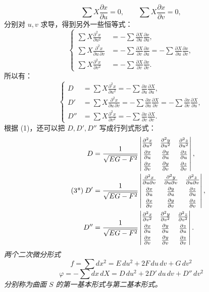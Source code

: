 \[
 \sum X\frac{\partial x}{\partial u}=0,\qquad
 \sum X\frac{\partial x}{\partial v}=0,
\]
分别对 \(u,v\) 求导，得到另外一些恒等式：
\[
\left\{
\begin{aligned}
 \sum X\frac{\partial^2x}{\partial u^2}
 &= -\sum\frac{\partial X}{\partial u}\frac{\partial x}{\partial u},\\
 \sum X\frac{\partial^2x}{\partial u\,\partial v}
 &= -\sum\frac{\partial X}{\partial v}\frac{\partial x}{\partial u}
  = -\sum\frac{\partial X}{\partial u}\frac{\partial x}{\partial v},\\
 \sum X\frac{\partial^2x}{\partial v^2}
 &= -\sum\frac{\partial X}{\partial v}\frac{\partial x}{\partial v}.
\end{aligned}
\right.
\]
所以有：
\begin{equation}\tag{3}
\left\{
\begin{aligned}
 D&=\sum X\frac{\partial^2x}{\partial u^2}
   =-\sum\frac{\partial x}{\partial u}\frac{\partial X}{\partial u},\\
 D'&=\sum X\frac{\partial^2x}{\partial u\,\partial v}
   =-\sum\frac{\partial x}{\partial u}\frac{\partial X}{\partial v}
   =-\sum\frac{\partial x}{\partial v}\frac{\partial X}{\partial u},\\
 D''&=\sum X\frac{\partial^2x}{\partial v^2}
   =-\sum\frac{\partial x}{\partial v}\frac{\partial X}{\partial v}.
\end{aligned}
\right.
\end{equation}
根据 (1)，还可以把 \(D,D',D''\) 写成行列式形式：
\begin{equation}\tag{3*}
\begin{aligned}
D&=\frac{1}{\sqrt{EG-F^2}}
\left|\begin{matrix}
\frac{\partial^2x}{\partial u^2}&\frac{\partial^2y}{\partial u^2}&\frac{\partial^2z}{\partial u^2}\\[0.35em]
\frac{\partial x}{\partial u}&\frac{\partial y}{\partial u}&\frac{\partial z}{\partial u}\\[0.35em]
\frac{\partial x}{\partial v}&\frac{\partial y}{\partial v}&\frac{\partial z}{\partial v}\end{matrix}\right|,\\
D'&=\frac{1}{\sqrt{EG-F^2}}
\left|\begin{matrix}
\frac{\partial^2x}{\partial u\partial v}&\frac{\partial^2y}{\partial u\partial v}&\frac{\partial^2z}{\partial u\partial v}\\[0.35em]
\frac{\partial x}{\partial u}&\frac{\partial y}{\partial u}&\frac{\partial z}{\partial u}\\[0.35em]
\frac{\partial x}{\partial v}&\frac{\partial y}{\partial v}&\frac{\partial z}{\partial v}\end{matrix}\right|,\\
D''&=\frac{1}{\sqrt{EG-F^2}}
\left|\begin{matrix}
\frac{\partial^2x}{\partial v^2}&\frac{\partial^2y}{\partial v^2}&\frac{\partial^2z}{\partial v^2}\\[0.35em]
\frac{\partial x}{\partial u}&\frac{\partial y}{\partial u}&\frac{\partial z}{\partial u}\\[0.35em]
\frac{\partial x}{\partial v}&\frac{\partial y}{\partial v}&\frac{\partial z}{\partial v}\end{matrix}\right|.
\end{aligned}
\end{equation}
\emph{两个二次微分形式}
\[
 f=\sum dx^2=E\,du^2+2F\,du\,dv+G\,dv^2
\]
\[
 \varphi=-\sum dx\,dX=D\,du^2+2D'\,du\,dv+D''\,dv^2
\]
\emph{分别称为曲面 \(S\) 的第一基本形式与第二基本形式。}

